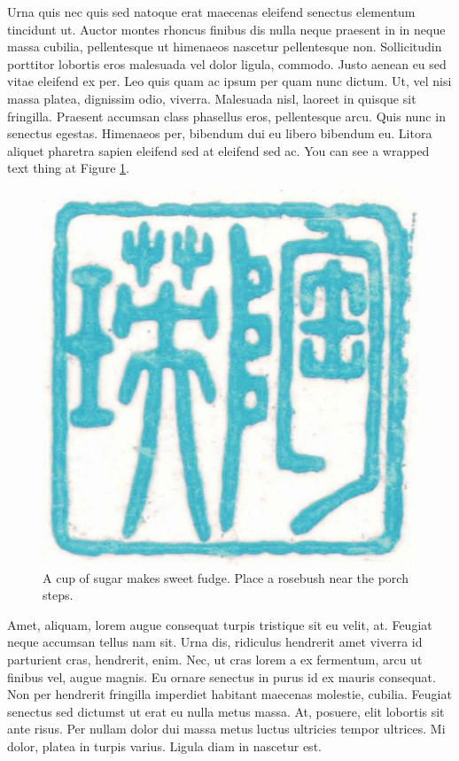 \documentclass[
  9pt,
  letterpaper,
  DIV=11,
  numbers=noendperiod]{scrartcl}
\begin{document}
Urna quis nec quis sed natoque erat maecenas eleifend senectus elementum
tincidunt ut. Auctor montes rhoncus finibus dis nulla neque praesent in
in neque massa cubilia, pellentesque ut himenaeos nascetur pellentesque
non. Sollicitudin porttitor lobortis eros malesuada vel dolor ligula,
commodo. Justo aenean eu sed vitae eleifend ex per. Leo quis quam ac
ipsum per quam nunc dictum. Ut, vel nisi massa platea, dignissim odio,
viverra. Malesuada nisl, laoreet in quisque sit fringilla. Praesent
accumsan class phasellus eros, pellentesque arcu. Quis nunc in senectus
egestas. Himenaeos per, bibendum dui eu libero bibendum eu. Litora
aliquet pharetra sapien eleifend sed at eleifend sed ac. You can see a
wrapped text thing at Figure \ref{fig-wrap-filter}.

\begin{figure}\centering\includegraphics{stamp1b.jpg}\caption{\label{fig-wrap-filter}
A cup of sugar makes sweet fudge. Place a rosebush near the porch
steps.}\end{figure}

Amet, aliquam, lorem augue consequat turpis tristique sit eu velit, at.
Feugiat neque accumsan tellus nam sit. Urna dis, ridiculus hendrerit
amet viverra id parturient cras, hendrerit, enim. Nec, ut cras lorem a
ex fermentum, arcu ut finibus vel, augue magnis. Eu ornare senectus in
purus id ex mauris consequat. Non per hendrerit fringilla imperdiet
habitant maecenas molestie, cubilia. Feugiat senectus sed dictumst ut
erat eu nulla metus massa. At, posuere, elit lobortis sit ante risus.
Per nullam dolor dui massa metus luctus ultricies tempor ultrices. Mi
dolor, platea in turpis varius. Ligula diam in nascetur est.
\end{document}
